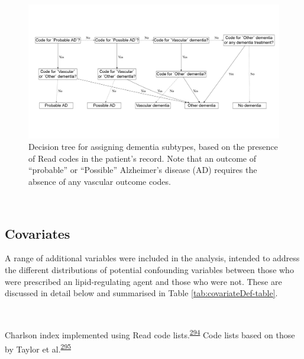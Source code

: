 \documentclass[a4paper, twoside]{templates/ociamthesis}
\begin{document}
\begin{figure}[H]
\includegraphics[width=1\linewidth]{figures/cprd-analysis/decision_tree} \caption[Decision tree for assigning dementia subtypes]{Decision tree for assigning dementia subtypes, based on the presence of Read codes in the patient's record. Note that an outcome of ``probable'' or ``Possible'' Alzheimer's disease (AD) requires the absence of any vascular outcome codes.}\label{fig:decisionTreeFig}
\end{figure}

~

\hypertarget{covariates}{%
\subsection{Covariates}\label{covariates}}

A range of additional variables were included in the analysis, intended to address the different distributions of potential confounding variables between those who were prescribed an lipid-regulating agent and those who were not. These are discussed in detail below and summarised in Table \ref{tab:covariateDef-table}.

~









Charlson index implemented using Read code lists.\textsuperscript{\protect\hyperlink{ref-khan2010}{294}} Code lists based on those by Taylor et al.\textsuperscript{\protect\hyperlink{ref-taylor2016}{295}}
\end{document}
